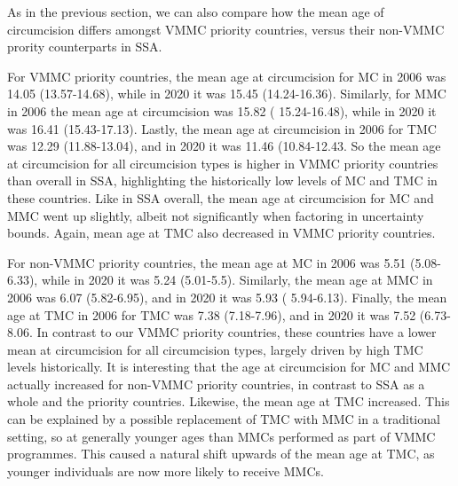 \documentclass{article}
\begin{document}
As in the previous section, we can also compare how the mean age of circumcision differs amongst VMMC
priority countries, versus their non-VMMC prority counterparts in SSA.

For VMMC priority countries, the mean age at circumcision for MC in 2006 was 14.05 (13.57-14.68), while
in 2020 it was 15.45 (14.24-16.36). Similarly, for MMC in 2006 the mean age at circumcision was 15.82 (
15.24-16.48), while in 2020 it was 16.41 (15.43-17.13). Lastly, the mean age at circumcision in 2006 for
TMC was 12.29 (11.88-13.04), and in 2020 it was 11.46 (10.84-12.43. So the mean age at circumcision for
all circumcision types is higher in VMMC priority countries than overall in SSA, highlighting the historically
low levels of MC and TMC in these countries. Like in SSA overall, the mean age at circumcision for MC and
MMC went up slightly, albeit not significantly when factoring in uncertainty bounds. Again, mean age at
TMC also decreased in VMMC priority countries.

For non-VMMC priority countries, the mean age at MC in 2006 was 5.51 (5.08-6.33), while in 2020 it was
5.24 (5.01-5.5). Similarly, the mean age at MMC in 2006 was 6.07 (5.82-6.95), and in 2020 it was 5.93 (
5.94-6.13). Finally, the mean age at TMC in 2006 for TMC was 7.38 (7.18-7.96), and in 2020 it was 7.52
(6.73-8.06. In contrast to our VMMC priority countries, these countries have a lower mean at circumcision
for all circumcision types, largely driven by high TMC levels historically. It is interesting that the age at
circumcision for MC and MMC actually increased for non-VMMC priority countries, in contrast to SSA as a
whole and the priority countries. Likewise, the mean age at TMC increased. This can be explained
by a possible replacement of TMC with MMC in a traditional setting, so at generally younger ages than
MMCs performed as part of VMMC programmes. This caused a natural shift upwards of the mean age at
TMC, as younger individuals are now more likely to receive MMCs.

\end{document}

